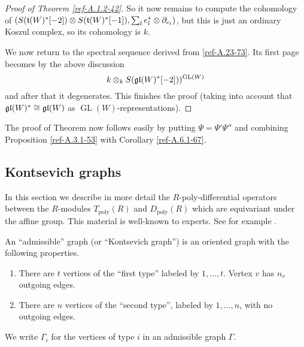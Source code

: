 \documentclass{amsart}
\numberwithin{equation}{section}
\theoremstyle{definition}
\theoremstyle{remark}
\begin{document}
\begin{proof}[Proof of Theorem \ref{ref-A.1.2-42}]
So it now remains to compute the cohomology of
$(S(\frak{t}(W)^\ast[-2])\otimes S(\frak{t}(W)^\ast[-1]), \sum_l
e_l^\ast\otimes \partial_{e_l})$, but this is just an ordinary Koszul
complex, so its cohomology is $k$.

\medskip

We now return to the spectral sequence derived from \eqref{ref-A.23-73}. Its first page becomes by the above discussion
\[
k\otimes_k S(\frak{gl}(W)^\ast[-2]))^{{\operatorname {GL}}(W)}
\]
and after that it degenerates. This finishes the proof (taking into account
that $\frak{gl}(W)^\ast\cong \frak{gl}(W)$ as ${\operatorname {GL}}(W)$-representations). 
\end{proof}
The proof of Theorem now follows easily by putting $\Psi=\Psi'\Psi''$ and
combining Proposition \ref{ref-A.3.1-53} with Corollary \ref{ref-A.6.1-67}.
\subsection{Kontsevich graphs}
\label{ref-A.7-77}
In this section we describe in more detail the $R$-poly-differential
operators between the $R$-modules $ T_{\operatorname{poly}}(R)$ and $D_{\operatorname{poly}}(R) $
which are equivariant under the affine group. This material is
well-known to experts. See for example \cite{GamHal,Shoikhet}.

\medskip

An ``admissible'' graph (or ``Kontsevich graph'') is an oriented graph with
the following properties. 
\begin{enumerate}
\item There are $t$ vertices of the ``first type''  labeled by
$1,\ldots,t$. Vertex $v$ has $n_v$ outgoing edges.
\item There are $n$ vertices of the ``second type'', labeled by $1,\ldots,n$,
with no outgoing edges.
\end{enumerate}
We write $\Gamma_i$ for the vertices of type $i$ in an admissible
graph $\Gamma$.

\medskip
\end{document}
